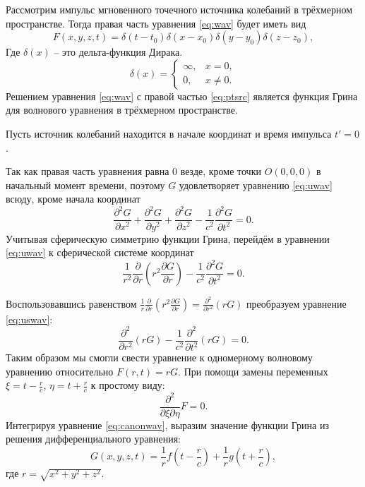 \documentclass[a4paper, fontsize=14pt]{article}
\begin{document}
	Рассмотрим импульс мгновенного точечного источника колебаний в трёхмерном пространстве.
	Тогда правая часть уравнения \eqref{eq:wav} будет иметь вид \cite{zhdanov1988}
	\begin{equation}
		F(x,y,z,t) = \delta(t-t_0)\delta(x-x_0)\delta(y-y_0)\delta(z-z_0),
		\label{eq:ptsrc}
	\end{equation}
	Где $\delta(x)$ -- это дельта-функция Дирака.
	\begin{equation}
		\delta(x)=\begin{cases}
			\infty,&x=0,\\
			0,&x\neq 0.
		\end{cases}
		\label{eq:deltadef}
	\end{equation}	
	Решением уравнения \eqref{eq:wav} с правой частью \eqref{eq:ptsrc} является функция
	Грина для волнового уравнения в трёхмерном пространстве.
	
	Пусть источник колебаний находится в начале координат и время импульса $t' = 0$. 
	
	Так как правая часть уравнения равна 0 везде, кроме точки $O(0,0,0)$ в начальный момент времени, поэтому 
	$G$ удовлетворяет уравнению \eqref{eq:uwav} всюду, кроме начала координат
	\begin{equation}
		\frac{\partial^2 G}{\partial x^2} + \frac{\partial^2 G}{\partial y^2} +
		\frac{\partial^2 G}{\partial z^2} - \frac{1}{c^2} \frac{\partial^2 G}{\partial
			t^2} = 0.
		\label{eq:uwav}
	\end{equation}
	Учитывая сферическую симметрию функции Грина, перейдём в уравнении \eqref{eq:uwav} к сферической системе координат
	\begin{equation}
		\frac{1}{r^2}\frac{\partial}{\partial r}\left( r^2 \frac{\partial G}{\partial r} \right)- \frac{1}{c^2} \frac{\partial^2 G}{\partial
			t^2} = 0.
		\label{eq:uswav}
	\end{equation}

	Воспользовавшись равенством $\frac{1}{r}\frac{\partial}{\partial r}\left(r^2\frac{\partial G}{\partial r}\right) = \frac{\partial^2}{\partial r^2}\left(rG\right)$ преобразуем уравнение \eqref{eq:uswav}:
	\begin{equation}
		\frac{\partial^2}{\partial r^2}\left( r  G\right)- \frac{1}{c^2} \frac{\partial^2 }{\partial
			t^2}\left(r G\right) = 0.
		\label{eq:uswav2}
	\end{equation}
	Таким образом мы смогли свести уравнение к одномерному волновому уравнению относительно $F(r,t) = rG$. При помощи замены переменных $\xi = t - \frac{r}{c}$, $\eta = t+\frac{r}{c}$ к простому виду:
	\begin{equation}
		\frac{\partial^2}{\partial \xi \partial \eta} F = 0.
		\label{eq:canonwav}
	\end{equation}
	Интегрируя уравнение \eqref{eq:canonwav}, выразим значение функции Грина из решения дифференциального уравнения:
	\begin{equation}
		G(x,y,z,t) = \frac{1}{r}f\left(t-\frac{r}{c}\right) + \frac{1}{r} g\left(t+\frac{r}{c}\right),
		\label{eq:canonsol}
	\end{equation}
где $r = \sqrt{x^2+y^2+z^2}$.
\end{document}
